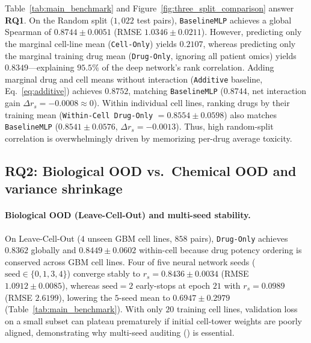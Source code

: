 \documentclass{article}
\begin{document}
Table~\ref{tab:main_benchmark} and Figure~\ref{fig:three_split_comparison} answer \textbf{RQ1}. On the Random split ($1,022$ test pairs), \texttt{BaselineMLP} achieves a global Spearman of $0.8744 \pm 0.0051$ (RMSE $1.0346 \pm 0.0211$). However, predicting only the marginal cell-line mean (\texttt{Cell-Only}) yields $0.2107$, whereas predicting only the marginal training drug mean (\texttt{Drug-Only}, ignoring all patient omics) yields $0.8349$---explaining $95.5\%$ of the deep network's rank correlation. Adding marginal drug and cell means without interaction (\texttt{Additive} baseline, Eq.~\ref{eq:additive}) achieves $0.8752$, matching \texttt{BaselineMLP} ($0.8744$, net interaction gain $\Delta r_s = -0.0008 \approx 0$). Within individual cell lines, ranking drugs by their training mean (\texttt{Within-Cell Drug-Only} $= 0.8554 \pm 0.0598$) also matches \texttt{BaselineMLP} ($0.8541 \pm 0.0576$, $\Delta r_s = -0.0013$). Thus, high random-split correlation is overwhelmingly driven by memorizing per-drug average toxicity.

\subsection{RQ2: Biological OOD vs.\ Chemical OOD and variance shrinkage}

\paragraph{Biological OOD (Leave-Cell-Out) and multi-seed stability.}
On Leave-Cell-Out ($4$ unseen GBM cell lines, $858$ pairs), \texttt{Drug-Only} achieves $0.8362$ globally and $0.8449 \pm 0.0602$ within-cell because drug potency ordering is conserved across GBM cell lines. Four of five neural network seeds ($\text{seed} \in \{0, 1, 3, 4\}$) converge stably to $r_s = 0.8436 \pm 0.0034$ (RMSE $1.0912 \pm 0.0085$), whereas $\text{seed}=2$ early-stops at epoch $21$ with $r_s = 0.0989$ (RMSE $2.6199$), lowering the $5$-seed mean to $0.6947 \pm 0.2979$ (Table~\ref{tab:main_benchmark}). With only $20$ training cell lines, validation loss on a small subset can plateau prematurely if initial cell-tower weights are poorly aligned, demonstrating why multi-seed auditing () is essential.
\end{document}
